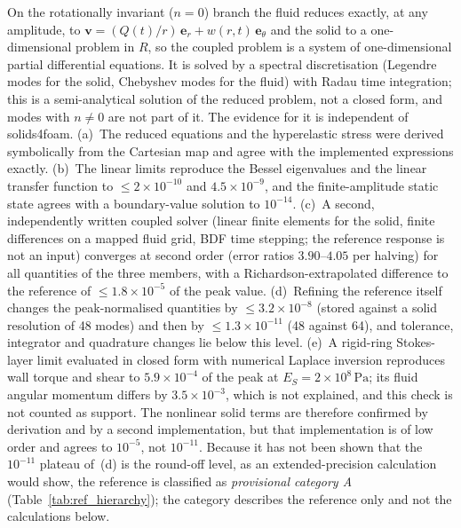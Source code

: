 On the rotationally invariant ($n=0$) branch the fluid reduces exactly, at any amplitude, to $\mathbf{v}=(Q(t)/r)\,\mathbf{e}_r+w(r,t)\,\mathbf{e}_\theta$ and the solid to a one-dimensional problem in $R$, so the coupled problem is a system of one-dimensional partial differential equations.
It is solved by a spectral discretisation (Legendre modes for the solid, Chebyshev modes for the fluid) with Radau time integration; this is a semi-analytical solution of the reduced problem, not a closed form, and modes with $n\neq0$ are not part of it.
The evidence for it is independent of solids4foam.
(a)~The reduced equations and the hyperelastic stress were derived symbolically from the Cartesian map and agree with the implemented expressions exactly.
(b)~The linear limits reproduce the Bessel eigenvalues and the linear transfer function to $\le2\times10^{-10}$ and $4.5\times10^{-9}$, and the finite-amplitude static state agrees with a boundary-value solution to $10^{-14}$.
(c)~A second, independently written coupled solver (linear finite elements for the solid, finite differences on a mapped fluid grid, BDF time stepping; the reference response is not an input) converges at second order (error ratios $3.90$--$4.05$ per halving) for all quantities of the three members, with a Richardson-extrapolated difference to the reference of $\le1.8\times10^{-5}$ of the peak value.
(d)~Refining the reference itself changes the peak-normalised quantities by $\le3.2\times10^{-8}$ (stored against a solid resolution of 48 modes) and then by $\le1.3\times10^{-11}$ (48 against 64), and tolerance, integrator and quadrature changes lie below this level.
(e)~A rigid-ring Stokes-layer limit evaluated in closed form with numerical Laplace inversion reproduces wall torque and shear to $5.9\times10^{-4}$ of the peak at $E_S=2\times10^{8}\,\mathrm{Pa}$; its fluid angular momentum differs by $3.5\times10^{-3}$, which is not explained, and this check is not counted as support.
The nonlinear solid terms are therefore confirmed by derivation and by a second implementation, but that implementation is of low order and agrees to $10^{-5}$, not $10^{-11}$.
Because it has not been shown that the $10^{-11}$ plateau of~(d) is the round-off level, as an extended-precision calculation would show, the reference is classified as \emph{provisional category A} (Table~\ref{tab:ref_hierarchy}); the category describes the reference only and not the calculations below.

